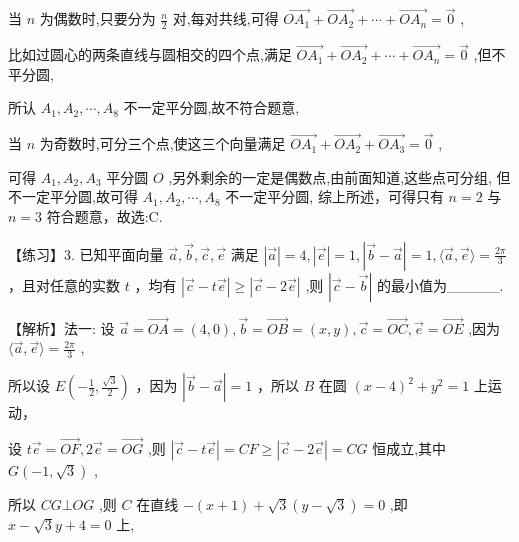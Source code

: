 \documentclass[10pt]{article}
\begin{document}
当 \(n\) 为偶数时,只要分为 \(\frac{n}{2}\) 对,每对共线,可得 \(\overrightarrow{O{A}_{1}} + \overrightarrow{O{A}_{2}} + \cdots  + \overrightarrow{O{A}_{n}} = \overrightarrow{0}\) ,

比如过圆心的两条直线与圆相交的四个点,满足 \(\overrightarrow{O{A}_{1}} + \overrightarrow{O{A}_{2}} + \cdots  + \overrightarrow{O{A}_{n}} = \overrightarrow{0}\) ,但不平分圆,

所认 \({A}_{1},{A}_{2},\cdots ,{A}_{8}\) 不一定平分圆,故不符合题意,

当 \(n\) 为奇数时,可分三个点,使这三个向量满足 \(\overrightarrow{O{A}_{1}} + \overrightarrow{O{A}_{2}} + \overrightarrow{O{A}_{3}} = \overrightarrow{0}\) ,

可得 \({A}_{1},{A}_{2},{A}_{3}\) 平分圆 \(O\) ,另外剩余的一定是偶数点,由前面知道,这些点可分组, 但不一定平分圆,故可得 \({A}_{1},{A}_{2},\cdots ,{A}_{8}\) 不一定平分圆, 综上所述，可得只有 \(n = 2\) 与 \(n = 3\) 符合题意，故选:C.

【练习】3. 已知平面向量 \(\overrightarrow{a},\overrightarrow{b},\overrightarrow{c},\overrightarrow{e}\) 满足 \(\left| \overrightarrow{a}\right|  = 4,\left| \overrightarrow{e}\right|  = 1,\left| {\overrightarrow{b} - \overrightarrow{a}}\right|  = 1,\langle \overrightarrow{a},\overrightarrow{e}\rangle  = \frac{2\pi }{3}\) ，且对任意的实数 \(t\) ，均有 \(\left| {\overrightarrow{c} - t\overrightarrow{e}}\right|  \geq  \left| {\overrightarrow{c} - 2\overrightarrow{e}}\right|\) ,则 \(\left| {\overrightarrow{c} - \overrightarrow{b}}\right|\) 的最小值为\_\_\_\_\_.

【解析】法一: 设 \(\overrightarrow{a} = \overrightarrow{OA} = \left( {4,0}\right) ,\overrightarrow{b} = \overrightarrow{OB} = \left( {x,y}\right) ,\overrightarrow{c} = \overrightarrow{OC},\overrightarrow{e} = \overrightarrow{OE}\) ,因为 \(\langle \overrightarrow{a},\overrightarrow{e}\rangle  = \frac{2\pi }{3}\) ,

所以设 \(E\left( {-\frac{1}{2},\frac{\sqrt{3}}{2}}\right)\) ，因为 \(\left| {\overrightarrow{b} - \overrightarrow{a}}\right|  = 1\) ，所以 \(B\) 在圆 \({\left( x - 4\right) }^{2} + {y}^{2} = 1\) 上运动，

设 \(t\overrightarrow{e} = \overrightarrow{OF},2\overrightarrow{e} = \overrightarrow{OG}\) ,则 \(\left| {\overrightarrow{c} - t\overrightarrow{e}}\right|  = {CF} \geq  \left| {\overrightarrow{c} - 2\overrightarrow{e}}\right|  = {CG}\) 恒成立,其中 \(G\left( {-1,\sqrt{3}}\right)\) ,

所以 \({CG} \bot  {OG}\) ,则 \(C\) 在直线 \(- \left( {x + 1}\right)  + \sqrt{3}\left( {y - \sqrt{3}}\right)  = 0\) ,即 \(x - \sqrt{3}y + 4 = 0\) 上,
\end{document}
